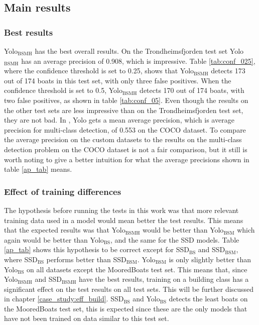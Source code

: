 \vspace{3mm}

\newpage

\subsection{Main results}
\label{subsec:main}

\subsubsection{Best results}
Yolo$_{\text{BSMH}}$ has the best overall results. On the Trondheimsfjorden test set Yolo$_{\text{BSMH}}$ has an average precision of 0.908, which is impressive. Table \ref{tab:conf_025}, where the confidence threshold is set to 0.25, shows that Yolo$_{\text{BSMH}}$ detects 173 out of 174 boats in this test set, with only three false positives. When the confidence threshold is set to 0.5, Yolo$_{\text{BSMH}}$ detects 170 out of 174 boats, with two false positives, as shown in table \ref{tab:conf_05}. Even though the results on the other test sets are less impressive than on the Trondheimsfjorden test set, they are not bad. In \citep{YOLOv3}, Yolo gets a mean average precision, which is average precision for multi-class detection, of 0.553 on the COCO dataset. To compare the average precision on the custom datasets to the results on the multi-class detection problem on the COCO dataset is not a fair comparison, but it still is worth noting to give a better intuition for what the average precisions shown in table \ref{ap_tab} means. 

\subsubsection{Effect of training differences}
The hypothesis before running the tests in this work was that more relevant training data used in a model would mean better the test results. This means that the expected results was that Yolo$_{\text{BSMH}}$ would be better than Yolo$_{\text{BSM}}$ which again would be better than Yolo$_{\text{BS}}$, and the same for the SSD models. Table \ref{ap_tab} shows this hypothesis to be correct except for SSD$_{\text{BS}}$ and SSD$_{\text{BSM}}$, where SSD$_{\text{BS}}$ performs better than SSD$_{\text{BSM}}$. Yolo$_{\text{BSM}}$ is only slightly better than Yolo$_{\text{BS}}$ on all datasets except the MooredBoats test set. This means that, since Yolo$_{\text{BSMH}}$ and SSD$_{\text{BSMH}}$ have the best results, training on a building class has a significant effect on the test results on all test sets. This will be further discussed in chapter \ref{case_study:eff_build}. SSD$_{\text{BS}}$ and Yolo$_{\text{BS}}$ detects the least boats on the MooredBoats test set, this is expected since these are the only models that have not been trained on data similar to this test set.

